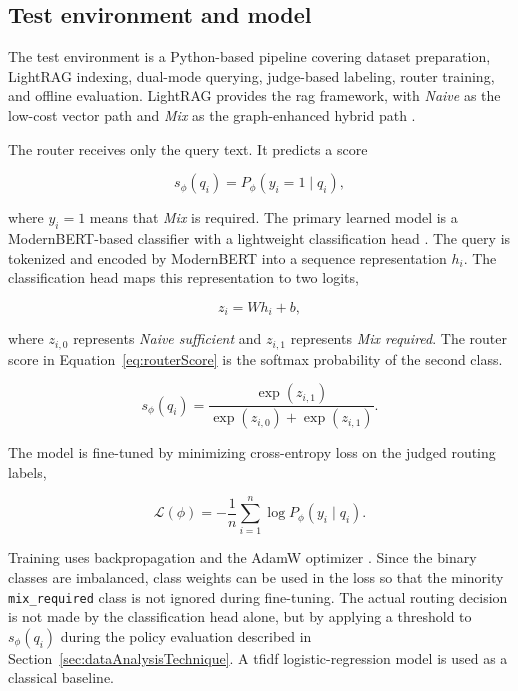 \documentclass[english, bibtex]{kththesis}               %
\numberwithin{listing}{chapter}
\begin{document}
\subsection{Test environment and model}

The test environment is a Python-based pipeline covering dataset preparation, LightRAG indexing, dual-mode querying, judge-based labeling, router training, and offline evaluation. LightRAG provides the \gls{rag} framework, with \emph{Naive} as the low-cost vector path and \emph{Mix} as the graph-enhanced hybrid path \cite{lightrag2024}.

The router receives only the query text. It predicts a score

\begin{equation}
\label{eq:routerScore}
s_\phi(q_i)=P_\phi(y_i=1 \mid q_i),
\end{equation}

where \(y_i=1\) means that \emph{Mix} is required. The primary learned model is a ModernBERT-based classifier with a lightweight classification head \cite{warner2024modernbert}. The query is tokenized and encoded by ModernBERT into a sequence representation \(h_i\). The classification head maps this representation to two logits,

\begin{equation}
\label{eq:modernBertLogits}
z_i = W h_i + b,
\end{equation}

where \(z_{i,0}\) represents \emph{Naive sufficient} and \(z_{i,1}\) represents \emph{Mix required}. The router score in Equation~\ref{eq:routerScore} is the softmax probability of the second class.

\begin{equation}
\label{eq:modernBertSoftmax}
s_\phi(q_i)=
\frac{\exp(z_{i,1})}
{\exp(z_{i,0})+\exp(z_{i,1})}.
\end{equation}

The model is fine-tuned by minimizing cross-entropy loss on the judged routing labels,

\begin{equation}
\label{eq:modernBertLoss}
\mathcal{L}(\phi)=
-\frac{1}{n}\sum_{i=1}^{n}
\log P_\phi(y_i \mid q_i).
\end{equation}

Training uses backpropagation and the AdamW optimizer \cite{loshchilov2019decoupled}. Since the binary classes are imbalanced, class weights can be used in the loss so that the minority \texttt{mix\_required} class is not ignored during fine-tuning. The actual routing decision is not made by the classification head alone, but by applying a threshold to \(s_\phi(q_i)\) during the policy evaluation described in Section~\ref{sec:dataAnalysisTechnique}. A \gls{tfidf} logistic-regression model is used as a classical baseline.
\end{document}
